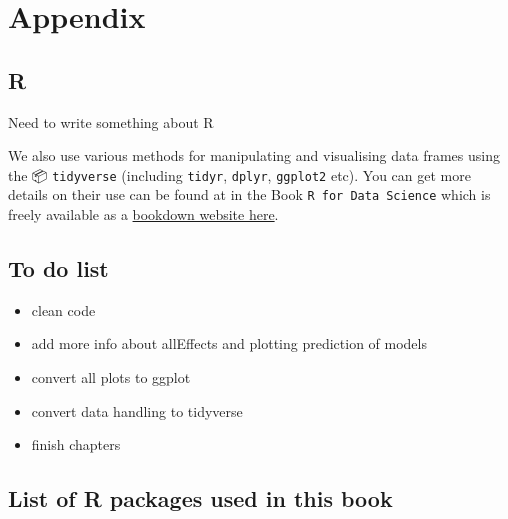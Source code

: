 \documentclass[
  12pt,
]{book}
\providecommand{\tightlist}{%
  \setlength{\itemsep}{0pt}\setlength{\parskip}{0pt}}
\begin{document}
\hypertarget{part-appendix}{%
\part{Appendix}\label{part-appendix}}

\hypertarget{r-1}{%
\chapter*{R}\label{r-1}}

Need to write something about R

We also use various methods for manipulating and visualising data frames using the 📦 \texttt{tidyverse} \citep{R-tidyverse} (including \texttt{tidyr}, \texttt{dplyr}, \texttt{ggplot2} etc).
You can get more details on their use can be found at in the Book \texttt{R\ for\ Data\ Science} \citep{wickhamDataScienceImport2016} which is freely available as a \href{http://r4ds.had.co.nz/}{bookdown website here}.

\hypertarget{to-do-list}{%
\chapter*{To do list}\label{to-do-list}}

\begin{itemize}
\tightlist
\item
  clean code
\item
  add more info about allEffects and plotting prediction of models
\item
  convert all plots to ggplot
\item
  convert data handling to tidyverse
\item
  finish chapters
\end{itemize}

\hypertarget{list-of-r-packages-used-in-this-book}{%
\chapter*{List of R packages used in this book}\label{list-of-r-packages-used-in-this-book}}
\end{document}
